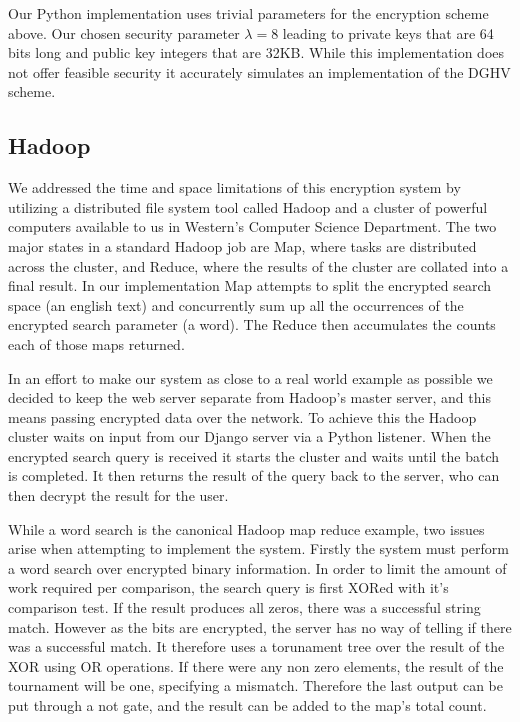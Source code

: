 \documentclass[letterpaper,11pt]{article} %
\begin{document}
Our Python implementation uses trivial parameters for the encryption scheme above. Our chosen security parameter $\lambda=8$ leading to private keys that are 64 bits long and public key integers that are 32KB. While this implementation does not offer feasible security it accurately simulates an implementation of the DGHV scheme.


\subsection*{Hadoop}


 We addressed the time and space limitations of this encryption system by utilizing a distributed file system tool called Hadoop and a cluster of powerful computers available to us in Western's Computer Science Department. The two major states in a standard Hadoop job are Map, where tasks are distributed across the cluster, and Reduce, where the results of the cluster are collated into a final result. In our implementation Map attempts to split the encrypted search space (an english text) and concurrently sum up all the occurrences of the encrypted search parameter (a word). The Reduce then accumulates the counts each of those maps returned. 

In an effort to make our system as close to a real world example as possible we decided to keep the web server separate from Hadoop's master server, and this means passing encrypted data over the network. To achieve this the Hadoop cluster waits on input from our Django server via a Python listener. When the encrypted search query is received it starts the cluster and waits until the batch is completed. It then returns the result of the query back to the server, who can then decrypt the result for the user. 

While a word search is the canonical Hadoop map reduce example, two issues arise when attempting to implement the system. Firstly the system must perform a word search over encrypted binary information. In order to limit the amount of work required per comparison, the search query is first XORed with it's comparison test. If the result produces all zeros, there was a successful string match. However as the bits are encrypted, the server has no way of telling if there was a successful match. It therefore uses a torunament tree over the result of the XOR using OR operations. If there were any non zero elements, the result of the tournament will be one, specifying a mismatch. Therefore the last output can be put through a not gate, and the result can be added to the map's total count.
\end{document}
